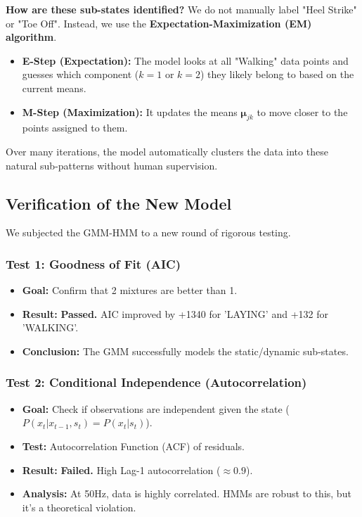 \documentclass[11pt,a4paper]{article}
\newcommand{\bmu}{\boldsymbol{\mu}}
\begin{document}
\textbf{How are these sub-states identified?}
We do not manually label "Heel Strike" or "Toe Off". Instead, we use the \textbf{Expectation-Maximization (EM) algorithm}.
\begin{itemize}
    \item \textbf{E-Step (Expectation):} The model looks at all "Walking" data points and guesses which component ($k=1$ or $k=2$) they likely belong to based on the current means.
    \item \textbf{M-Step (Maximization):} It updates the means $\bmu_{jk}$ to move closer to the points assigned to them.
\end{itemize}
Over many iterations, the model automatically clusters the data into these natural sub-patterns without human supervision.

\subsection{Verification of the New Model}
We subjected the GMM-HMM to a new round of rigorous testing.

\subsubsection{Test 1: Goodness of Fit (AIC)}
\begin{itemize}
    \item \textbf{Goal:} Confirm that 2 mixtures are better than 1.
    \item \textbf{Result:} \textbf{Passed.} AIC improved by +1340 for 'LAYING' and +132 for 'WALKING'.
    \item \textbf{Conclusion:} The GMM successfully models the static/dynamic sub-states.
\end{itemize}

\subsubsection{Test 2: Conditional Independence (Autocorrelation)}
\begin{itemize}
    \item \textbf{Goal:} Check if observations are independent given the state ($P(x_t | x_{t-1}, s_t) = P(x_t | s_t)$).
    \item \textbf{Test:} Autocorrelation Function (ACF) of residuals.
    \item \textbf{Result:} \textbf{Failed.} High Lag-1 autocorrelation ($\approx 0.9$).
    \item \textbf{Analysis:} At 50Hz, data is highly correlated. HMMs are robust to this, but it's a theoretical violation.
\end{itemize}
\end{document}
